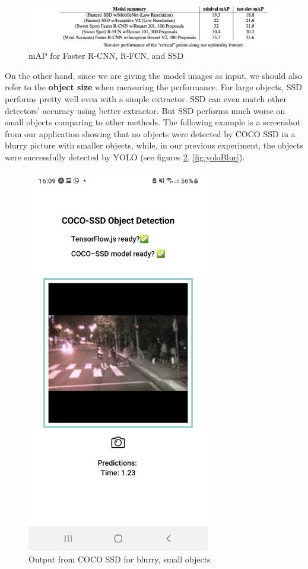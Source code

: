 \documentclass[runningheads,a4paper,11pt]{report}
\begin{document}
\begin{figure}
\centering
\includegraphics[width=15cm]{images/googleResearch.png}
 \caption{mAP for Faster R-CNN, R-FCN, and SSD}\label{fig:googleR}
\end{figure}

On the other hand, since we are giving the model images as input, we should also refer to the \textbf{object size} when measuring the performance. For large objects, SSD performs pretty well even with a simple extractor. SSD can even match other detectors' accuracy using better extractor. But SSD performs much worse on small objects comparing to other methods. The following example is a screenshot from our application showing that no objects were detected by COCO SSD in a blurry picture with smaller objects, while, in our previous experiment, the objects were successfully detected by YOLO (see figures \ref{fig:cocoBlur}, \ref{fig:yoloBlur}).

\begin{figure}
    \centering
\includegraphics[width=8cm]{images/screenshot1.jpg} \caption{Output from COCO SSD for blurry, small objects}\label{fig:cocoBlur}
\end{figure}
\end{document}
